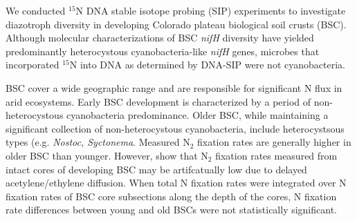 We conducted $^{15}$N DNA stable isotope probing (SIP) experiments to investigate diazotroph diversity in developing Colorado plateau biological soil crusts (BSC). Although molecular characterizations of BSC \textit{nifH} diversity have yielded predominantly heterocystous cyanobacteria-like \textit{nifH} genes, microbes that incorporated $^{15}$N into DNA as determined by DNA-SIP were not cyanobacteria.

BSC cover a wide geographic range and are responsible for significant N flux in arid ecosystems. Early BSC development is characterized by a period of non-heterocystous cyanobacteria predominance. Older BSC, while maintaining a significant collection of non-heterocystous cyanobacteria, include heterocystsous types (e.g. \textit{Nostoc, Syctonema}. Measured N$_{2}$ fixation rates are generally higher in older BSC than younger. However, \citet{15643930} show that N$_{2}$ fixation rates measured from intact cores of developing BSC may be artifcatually low due to delayed acetylene/ethylene diffusion. When total N fixation rates were integrated over N fixation rates of BSC core subsections along the depth of the cores, N fixation rate differences between young and old BSCs were not statistically significant.


